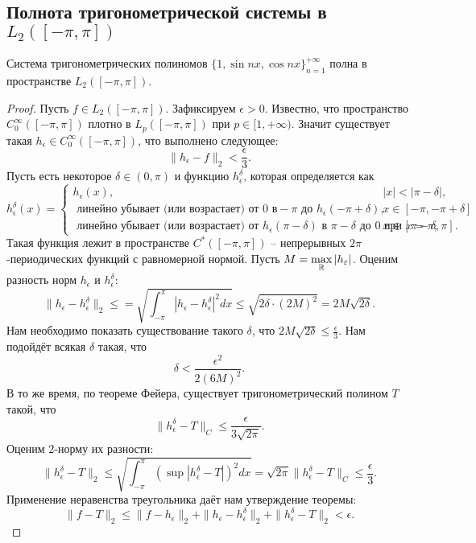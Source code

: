 \subsection{Полнота тригонометрической системы в $L_2([-\pi, \pi])$}
\begin{theorem}
    Система тригонометрических полиномов $\{1, \sin nx, \cos nx\}_{n = 1}^{+\infty}$ полна в пространстве $L_2([-\pi, \pi])$.
\end{theorem}
\begin{proof}
    Пусть $f \in L_2([-\pi, \pi])$.
    Зафиксируем $\epsilon > 0$.
    Известно, что пространство $C_0^\infty([-\pi, \pi])$ плотно в $L_p([-\pi, \pi])$ при $p \in [1, +\infty)$.
    Значит существует такая $h_\epsilon \in C_0^\infty([-\pi, \pi])$, что выполнено следующее:
    \[
        \|h_\epsilon - f\|_2 < \frac{\epsilon}{3}.
    \]
    Пусть есть некоторое $\delta \in (0, \pi)$ и функцию $h_\epsilon^\delta$, которая определяется как
    \[
        h_{\epsilon}^{\delta}(x) =
        \begin{cases}
            h_{\epsilon}(x), & |x| < |\pi - \delta|, \\
            \text{ линейно убывает (или возрастает) от 0 в} -\pi \text{ до } h_\epsilon(-\pi + \delta), & x \in [-\pi, -\pi + \delta] \\
            \text{ линейно убывает (или возрастает) от } h_\epsilon(\pi - \delta) \text{ в } \pi - \delta \text{ до } 0 \text{ при } x = \pi, & x \in [\pi - \delta, \pi].
        \end{cases}
    \]
    Такая функция лежит в пространстве $C^*([-\pi, \pi])$ -- непрерывных $2\pi$-периодических функций с равномерной нормой.
    Пусть $M = \max\limits_{\mathbb{R}} |h_{\varepsilon}|$.
    Оценим разность норм $h_\epsilon$ и $h_\epsilon^\delta$:
    \[
        \|h_\epsilon - h_\epsilon^\delta\|_2 \leq = \sqrt {\int_{-\pi}^{\pi} |h_\epsilon - h_\epsilon^\delta|^2 dx} \leq \sqrt{2 \delta \cdot (2M)^2} = 2M\sqrt {2\delta}.
    \]
    Нам необходимо показать существование такого $\delta$, что $2M \sqrt {2\delta} \leq \frac{\epsilon}{3}$.
    Нам подойдёт всякая $\delta$ такая, что
    \[
        \delta < \frac{\epsilon^2}{2(6M)^2}.
    \]
    В то же время, по теореме Фейера, существует тригонометрический полином $T$ такой, что \[\|h_\epsilon^\delta - T\|_C \leq \frac{\epsilon}{3\sqrt {2\pi}}.\]
    Оценим $2$-норму их разности:
    \[
        \|h_\epsilon^\delta - T\|_2 \leq \sqrt {\int_{-\pi}^{\pi} (\sup|h_\epsilon^\delta - T|)^2dx} = \sqrt {2\pi}\|h_\epsilon^\delta - T\|_C \leq \dfrac{\epsilon}{3}.
    \]
    Применение неравенства треугольника даёт нам утверждение теоремы:
    \[
        \|f - T\|_2 \leq \|f - h_\epsilon\|_2 + \|h_\epsilon - h_\epsilon^\delta\|_2 + \|h_\epsilon^\delta - T\|_2 < \epsilon.
    \]
\end{proof}

